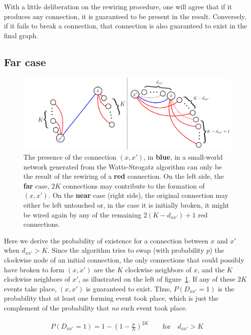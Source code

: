 With a little deliberation on the rewiring procedure, one will agree that if it produces any connection, it is guaranteed to be present
in the result. Conversely, if it fails to break a connection, that connection is also guaranteed to exist in the final graph.

\subsection{Far case}

\begin{figure}
    \centering
    \includegraphics[width=0.9\linewidth]{fig/rewire_contributions.png}
    \caption{The presence of the connection $(x,x')$, in {\color{blue}\textbf{blue}}, in a small-world network generated from the
        Watts-Strogatz algorithm can only be the result of the rewiring of a {\color{red}\textbf{red}} connection. On the left side,
        the \textbf{far} case, $2K$ connections may contribute to the formation of $(x,x')$. On the \textbf{near} case (right side),
        the original connection may either be left untouched or, in the case it is initially broken, it might be wired again by any of
        the remaining $2(K-d_{xx'})+1$ red connections.}
    \label{fig:rewire_contributions}
\end{figure}

Here we derive the probability of existence for a connection between $x$ and $x'$ when $d_{xx'}>K$. Since the algorithm tries to swap
(with probability $p$) the clockwise node of an initial connection, the only connections that could possibly have broken to form
$(x,x')$ are the $K$ clockwise neighbors of $x$, and the $K$ clockwise neighbors of $x'$, as illustrated on the left of
figure~\ref{fig:rewire_contributions}. If any of these $2K$ events take place, $(x,x')$ is guaranteed to exist. Thus, $P(D_{xx'}=1)$ is
the probability that at least one forming event took place, which is just the complement of the probability that \textit{no} such event
took place.

\begin{align}
    P(D_{xx'}=1) = 1 - \left( 1 - \frac{p}{N} \right)^{2K} \qquad \text{for} \quad d_{xx'} > K
    \label{eq:probfar}
\end{align}

